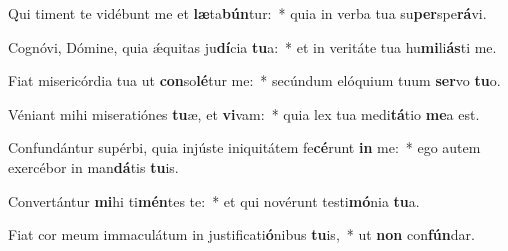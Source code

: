 \item Qui timent te vidébunt me et \textbf{læ}ta\textbf{bún}tur:~* quia in verba tua su\textbf{per}spe\textbf{rá}vi.
\item Cognóvi, Dómine, quia ǽquitas ju\textbf{dí}cia \textbf{tu}a:~* et in veritáte tua hu\textbf{mi}li\textbf{ás}ti me.
\item Fiat misericórdia tua ut \textbf{con}so\textbf{lé}tur me:~* secúndum elóquium tuum \textbf{ser}vo \textbf{tu}o.
\item Véniant mihi miseratiónes \textbf{tu}æ, et \textbf{vi}vam:~* quia lex tua medi\textbf{tá}tio \textbf{me}a est.
\item Confundántur supérbi, quia injúste iniquitátem fe\textbf{cé}runt \textbf{in} me:~* ego autem exercébor in man\textbf{dá}tis \textbf{tu}is.
\item Convertántur \textbf{mi}hi ti\textbf{mén}tes te:~* et qui novérunt testi\textbf{mó}nia \textbf{tu}a.
\item Fiat cor meum immaculátum in justificati\textbf{ó}nibus \textbf{tu}is,~* ut \textbf{non} con\textbf{fún}dar.
